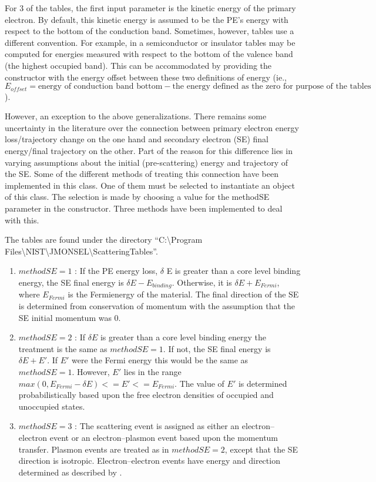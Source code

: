 For 3 of the tables, the first input parameter is the kinetic energy of the primary electron. By default, this kinetic energy is assumed to be the PE's energy with respect to the bottom of the conduction band. Sometimes, however, tables use a different convention. For example, in a semiconductor or insulator tables may be computed for energies measured with respect to the bottom of the valence band (the highest occupied band). This can be accommodated by providing the constructor with the energy offset between these two definitions of energy (ie., $E_{offset} = \text{energy of conduction band bottom} - \text{the energy defined as the zero for purpose of the tables}$).

However, an exception to the above generalizations. There remains some uncertainty in the literature over the connection between primary electron energy loss/trajectory change on the one hand and secondary electron (SE) final energy/final trajectory on the other. Part of the reason for this difference lies in varying assumptions about the initial (pre-scattering) energy and trajectory of the SE. Some of the different methods of treating this connection have been implemented in this class. One of them must be selected to instantiate an object of this class. The selection is made by choosing a value for the methodSE parameter in the constructor. Three methods have been implemented to deal with this.

The tables are found under the directory ``C:\textbackslash Program Files\textbackslash NIST\textbackslash JMONSEL\textbackslash ScatteringTables''.

\begin{enumerate}
    \item $methodSE=1$ \cite{ding1996monte}: If the PE energy loss, $\delta$ E is greater than a core level binding energy, the SE final energy is $\delta E-E_{binding}$. Otherwise, it is $\delta E + E_{Fermi}$, where $E_{Fermi}$ is the Fermienergy of the material. The final direction of the SE is determined from conservation of momentum with the assumption that the SE initial momentum was 0.
    \item $methodSE=2$ \cite{ding2001monte}: If $\delta E$ is greater than a core level binding energy the treatment is the same as $methodSE=1$. If not, the SE final energy is $\delta E + E'$. If $E'$ were the Fermi energy this would be the same as $methodSE = 1$. However, $E'$ lies in the range $max(0, E_{Fermi} - \delta E) <= E' <= E_{Fermi}$. The value of $E'$ is determined probabilistically based upon the free electron densities of occupied and unoccupied states.
    \item $methodSE=3$ \cite{mao2008electron}: The scattering event is assigned as either an electron--electron event or an electron--plasmon event based upon the momentum transfer. Plasmon events are treated as in $methodSE = 2$, except that the SE direction is isotropic. Electron--electron events have energy and direction determined as described by \cite{mao2008electron}.
\end{enumerate}

